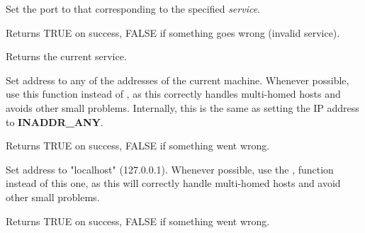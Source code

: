 Set the port to that corresponding to the specified {\it service}.


Returns TRUE on success, FALSE if something goes wrong
(invalid service).

%
%



Returns the current service.

%
%

\label{wxipv4addressanyaddress}


Set address to any of the addresses of the current machine. Whenever
possible, use this function instead of ,
as this correctly handles multi-homed hosts and avoids other small
problems. Internally, this is the same as setting the IP address
to {\bf INADDR\_ANY}.


Returns TRUE on success, FALSE if something went wrong.


%
%

\label{wxipv4addresslocalhost}


Set address to "localhost" (127.0.0.1). Whenever possible, use the
,
function instead of this one, as this will correctly handle multi-homed
hosts and avoid other small problems.


Returns TRUE on success, FALSE if something went wrong.

